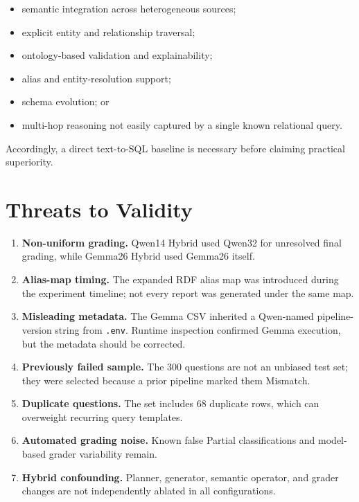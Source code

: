\documentclass[11pt]{article}
\begin{document}
\begin{itemize}[leftmargin=*]
    \item semantic integration across heterogeneous sources;
    \item explicit entity and relationship traversal;
    \item ontology-based validation and explainability;
    \item alias and entity-resolution support;
    \item schema evolution; or
    \item multi-hop reasoning not easily captured by a single known relational query.
\end{itemize}

Accordingly, a direct text-to-SQL baseline is necessary before claiming practical superiority.

\section{Threats to Validity}

\begin{enumerate}[leftmargin=*]
    \item \textbf{Non-uniform grading.} Qwen14 Hybrid used Qwen32 for unresolved final grading, while Gemma26 Hybrid used Gemma26 itself.
    \item \textbf{Alias-map timing.} The expanded RDF alias map was introduced during the experiment timeline; not every report was generated under the same map.
    \item \textbf{Misleading metadata.} The Gemma CSV inherited a Qwen-named pipeline-version string from \texttt{.env}. Runtime inspection confirmed Gemma execution, but the metadata should be corrected.
    \item \textbf{Previously failed sample.} The 300 questions are not an unbiased test set; they were selected because a prior pipeline marked them Mismatch.
    \item \textbf{Duplicate questions.} The set includes 68 duplicate rows, which can overweight recurring query templates.
    \item \textbf{Automated grading noise.} Known false Partial classifications and model-based grader variability remain.
    \item \textbf{Hybrid confounding.} Planner, generator, semantic operator, and grader changes are not independently ablated in all configurations.
\end{enumerate}
\end{document}
